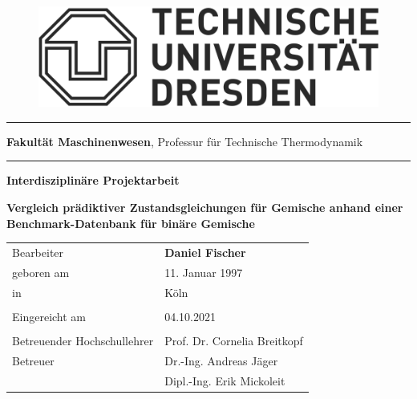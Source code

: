 \documentclass[../thesis.tex]{subfiles}
\begin{document}
\begin{titlepage}
	\begin{addmargin}[22mm]{0mm}
		\begin{figure}[t]
			\hspace*{5mm}\includegraphics[scale=0.35]{figs/Logo.png} \vspace{-8mm}
		\end{figure}
		\rule{140mm}{.4pt}
		\vspace{0.4mm}

		\scriptsize { {\bfseries Fakultät Maschinenwesen},
			Professur für Technische Thermodynamik}
		\vspace{-1.4mm}

		\rule{140mm}{.4pt}
		\vspace{2cm}

		{\Large \bfseries Interdisziplinäre Projektarbeit}
		\vspace{2cm}

		{\LARGE \bfseries Vergleich prädiktiver Zustandsgleichungen für Gemische anhand einer Benchmark-Datenbank für binäre Gemische \par}
		\vspace{2cm}
		\begin{addmargin}[-2mm]{0mm}
			\large
			\begin{tabular}{l l}
			  Bearbeiter                   & {\bfseries Daniel Fischer} \\
			  geboren am                   & 11. Januar 1997 \\
			  in                           & Köln \\ \\
			  Eingereicht am               & 04.10.2021 \\ \\
			  Betreuender Hochschullehrer  & Prof. Dr. Cornelia Breitkopf \\
			  Betreuer                     & Dr.-Ing. Andreas Jäger  \\
			  							   & Dipl.-Ing. Erik Mickoleit \\
			\end{tabular}
		\end{addmargin}
	\end{addmargin}
\end{titlepage}
\end{document}
